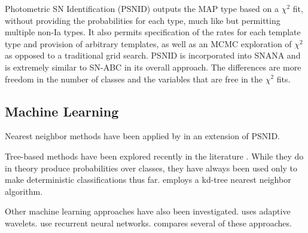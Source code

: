 \documentclass[12pt, onecolumn]{emulateapj}
\begin{document}
Photometric SN Identification (PSNID) \citep{Sako11} outputs the MAP type based on a $\chi^{2}$ fit, without providing the probabilities for each type, much like \citet{Poznanski06} but permitting multiple non-Ia types.  It also permits specification of the rates for each template type and provision of arbitrary templates, as well as an MCMC exploration of $\chi^{2}$ as opposed to a traditional grid search.  PSNID is incorporated into SNANA and is extremely similar to SN-ABC in its overall approach.  The differences are more freedom in the number of classes and the variables that are free in the $\chi^{2}$ fits.

\subsection{Machine Learning}

Nearest neighbor methods have been applied by \citet{Sako14} in an extension of PSNID.

Tree-based methods have been explored recently in the literature \citep{Richards11, Sako14, Lochner16, Moller16}.  While they do in theory produce probabilities over classes, they have always been used only to make deterministic classifications thus far.  \citet{Sako14} employs a kd-tree nearest neighbor algorithm.

Other machine learning approaches have also been investigated.  \citet{Varughese15} uses adaptive wavelets.  \citet{Karpenka12, Charnock16} use recurrent neural networks.  \citet{Lochner16} compares several of these approaches.




\end{document}
